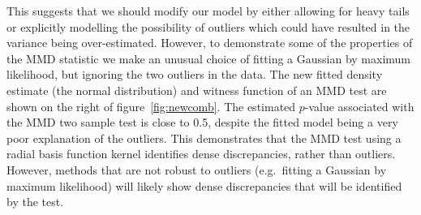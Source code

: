 \documentclass{article} %
\def\eg{e.g.\ }
\begin{document}
This suggests that we should modify our model by either allowing for heavy tails or explicitly modelling the possibility of outliers which could have resulted in the variance being over-estimated.
However, to demonstrate some of the properties of the MMD statistic we make an unusual choice of fitting a Gaussian by maximum likelihood, but ignoring the two outliers in the data.
The new fitted density estimate (the normal distribution) and witness function of an MMD test are shown on the right of figure~\ref{fig:newcomb}.
The estimated $p$-value associated with the MMD two sample test is close to 0.5, despite the fitted model being a very poor explanation of the outliers.
This demonstrates that the MMD test using a radial basis function kernel identifies dense discrepancies, rather than outliers.
However, methods that are not robust to outliers (\eg fitting a Gaussian by maximum likelihood) will likely show dense discrepancies that will be identified by the test.

%
%
%
%
%
\end{document}
